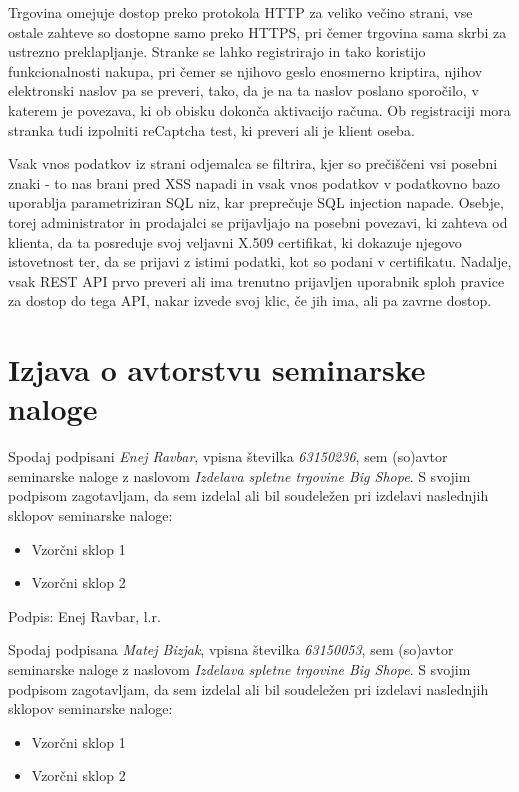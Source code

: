 \documentclass[a4paper,12pt]{report}
\newcommand{\naslov}     {Izdelava spletne trgovine Big Shope}
\newcommand{\prviavtor}  {Enej Ravbar}
\newcommand{\prviindeks} {63150236}
\newcommand{\drugiavtor} {Matej Bizjak}
\newcommand{\drugiindeks}{63150053}
\begin{document}
Trgovina omejuje dostop preko protokola HTTP za veliko večino strani, vse ostale zahteve so dostopne samo preko HTTPS, pri čemer trgovina sama skrbi za ustrezno preklapljanje. Stranke se lahko registrirajo in tako koristijo funkcionalnosti nakupa, pri čemer se njihovo geslo enosmerno kriptira, njihov elektronski naslov pa se preveri, tako, da je na ta naslov poslano sporočilo, v katerem je povezava, ki ob obisku dokonča aktivacijo računa. Ob registraciji mora stranka tudi izpolniti reCaptcha test, ki preveri ali je klient oseba.

Vsak vnos podatkov iz strani odjemalca se filtrira, kjer so prečiščeni vsi posebni znaki - to nas brani pred XSS napadi in vsak vnos podatkov v podatkovno bazo uporablja parametriziran SQL niz, kar preprečuje SQL injection napade. Osebje, torej administrator in prodajalci se prijavljajo na posebni povezavi, ki zahteva od klienta, da ta posreduje svoj veljavni X.509 certifikat, ki dokazuje njegovo istovetnost ter, da se prijavi z istimi podatki, kot so podani v certifikatu. Nadalje, vsak REST API prvo preveri ali ima trenutno prijavljen uporabnik sploh pravice za dostop do tega API, nakar izvede svoj klic, če jih ima, ali pa zavrne dostop.

\chapter{Izjava o avtorstvu seminarske naloge}

Spodaj podpisani \textit{\prviavtor}, vpisna številka \textit{\prviindeks}, sem (so)avtor seminarske naloge z naslovom \textit{\naslov}. S svojim podpisom zagotavljam, da sem izdelal ali bil soudeležen pri izdelavi naslednjih sklopov seminarske naloge:
\begin{itemize}
    \item Vzorčni sklop 1
	 \item Vzorčni sklop 2
\end{itemize}

Podpis: {\prviavtor}, l.r.

\newpage

Spodaj podpisana \textit{\drugiavtor}, vpisna številka \textit{\drugiindeks}, sem (so)avtor seminarske naloge z naslovom \textit{\naslov}. S svojim podpisom zagotavljam, da sem izdelal ali bil soudeležen pri izdelavi naslednjih sklopov seminarske naloge:
\begin{itemize}
    \item Vzorčni sklop 1
	 \item Vzorčni sklop 2
\end{itemize}
\end{document}

